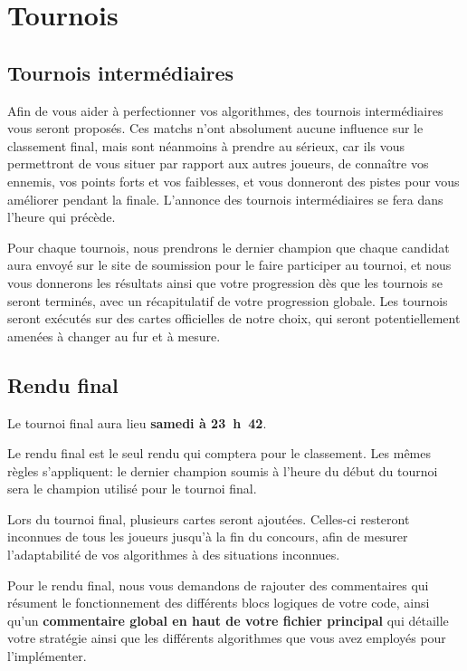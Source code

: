 
\section{Tournois}

\subsection{Tournois intermédiaires}

Afin de vous aider à perfectionner vos algorithmes, des tournois intermédiaires
vous seront proposés. Ces matchs n'ont absolument aucune influence sur le
classement final, mais sont néanmoins à prendre au sérieux, car ils vous
permettront de vous situer par rapport aux autres joueurs, de connaître vos
ennemis, vos points forts et vos faiblesses, et vous donneront des pistes pour
vous améliorer pendant la finale. L'annonce des tournois intermédiaires se fera
dans l'heure qui précède.

Pour chaque tournois, nous prendrons le dernier champion que chaque candidat
aura envoyé sur le site de soumission pour le faire participer au tournoi, et
nous vous donnerons les résultats ainsi que votre progression dès que les
tournois se seront terminés, avec un récapitulatif de votre progression
globale. Les tournois seront exécutés sur des cartes officielles de notre
choix, qui seront potentiellement amenées à changer au fur et à mesure.

\subsection{Rendu final}

Le tournoi final aura lieu \textbf{samedi à 23~h~42}.

Le rendu final est le seul rendu qui comptera pour le classement. Les mêmes
règles s'appliquent: le dernier champion soumis à l'heure du début du tournoi
sera le champion utilisé pour le tournoi final.

Lors du tournoi final, plusieurs cartes seront ajoutées. Celles-ci resteront
inconnues de tous les joueurs jusqu'à la fin du concours, afin de mesurer
l'adaptabilité de vos algorithmes à des situations inconnues.

Pour le rendu final, nous vous demandons de rajouter des commentaires qui
résument le fonctionnement des différents blocs logiques de votre code, ainsi
qu'un \textbf{commentaire global en haut de votre fichier principal} qui
détaille votre stratégie ainsi que les différents algorithmes que vous avez
employés pour l'implémenter.

